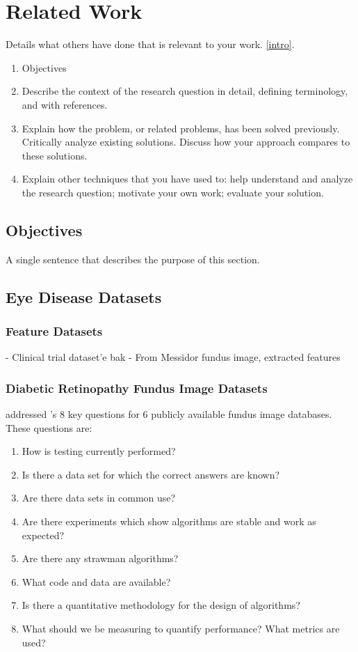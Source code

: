 \chapter{Related Work} 
\label{related_work}

Details what others have done that is relevant to your work. \ref{intro}.
\begin{enumerate}
    \item Objectives
    \item Describe the context of the research question in detail, defining terminology, and with references.
    \item Explain how the problem, or related problems, has been solved previously. Critically analyze existing solutions. Discuss how your approach compares to these solutions.
    \item Explain other techniques that you have used to: help understand and analyze the research question; motivate your own work; evaluate your solution.
\end{enumerate}
\section{Objectives}
A single sentence that describes the purpose of this section.
\section{Eye Disease Datasets}
\subsection{Feature Datasets}
- Clinical trial dataset'e bak
- From Messidor fundus image, extracted features 
\subsection{Diabetic Retinopathy Fundus Image Datasets}

\citet{kauppi2013constructing} addressed \citet{thacker2008performance}'s 8 key questions for 6 publicly available fundus image databases. These questions are:

\begin{enumerate}
    \item How is testing currently performed?
    \item Is there a data set for which the correct answers are known?
    \item Are there data sets in common use?
    \item Are there experiments which show algorithms are stable and work as expected?
    \item Are there any strawman algorithms?
    \item What code and data are available?
    \item Is there a quantitative methodology for the design of algorithms?
    \item What should we be measuring to quantify performance? What metrics are used?
\end{enumerate}

